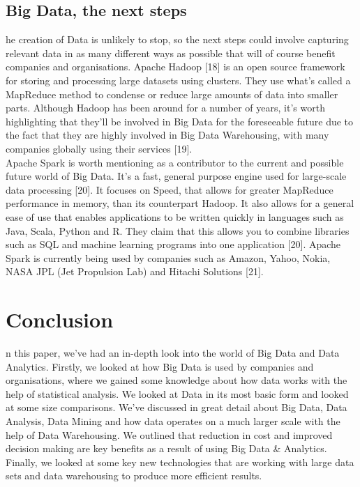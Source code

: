 \documentclass[10pt,journal,compsoc]{IEEEtran}
\begin{document}
\subsection{Big Data, the next steps}
he creation of Data is unlikely to stop, so the next steps could involve capturing relevant data in as many different ways as possible that will of course benefit companies and organisations. Apache Hadoop [18] is an open source framework for storing and processing large datasets using clusters. They use what's called a MapReduce method to condense or reduce large amounts of data into smaller parts. Although Hadoop has been around for a number of years, it's worth highlighting that they'll be involved in Big Data for the foreseeable future due to the fact that they are highly involved in Big Data Warehousing, with many companies globally using their services [19]. \\

Apache Spark is worth mentioning as a contributor to the current and possible future world of Big Data. It's a fast, general purpose engine used for large-scale data processing [20]. It focuses on Speed, that allows for greater MapReduce performance in memory, than its counterpart Hadoop. It also allows for a general ease of use that enables applications to be written quickly in languages such as Java, Scala, Python and R. They claim that this allows you to combine libraries such as SQL and machine learning programs into one application [20]. Apache Spark is currently being used by companies such as Amazon, Yahoo, Nokia, NASA JPL (Jet Propulsion Lab) and Hitachi Solutions [21].



\section{Conclusion}
n this paper, we've had an in-depth look into the world of Big Data and Data Analytics. Firstly, we looked at how Big Data is used by companies and organisations, where we gained some knowledge about how data works with the help of statistical analysis. We looked at Data in its most basic form and looked at some size comparisons. We've discussed in great detail about Big Data, Data Analysis, Data Mining and how data operates on a much larger scale with the help of Data Warehousing. We outlined that reduction in cost and improved decision making are key benefits as a result of using Big Data \& Analytics. Finally, we looked at some key new technologies that are working with large data sets and data warehousing to produce more efficient results.\\
\end{document}
